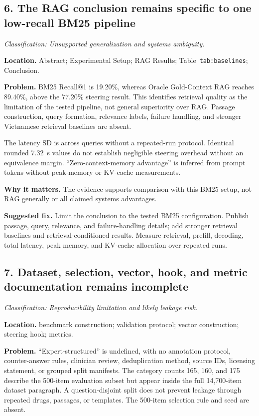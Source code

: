 \documentclass[11pt]{article}
\newcommand{\findinglabel}[1]{\textbf{#1}}
\newcommand{\classification}[1]{\textit{Classification: #1.}}
\begin{document}
\subsection*{6. The RAG conclusion remains specific to one low-recall BM25 pipeline}

\classification{Unsupported generalization and systems ambiguity}

\findinglabel{Location.} Abstract; Experimental Setup; RAG Results; Table~\texttt{tab:baselines}; Conclusion.

\findinglabel{Problem.} BM25 Recall@1 is 19.20\%, whereas Oracle Gold-Context RAG reaches 89.40\%, above the 77.20\% steering result.  This identifies retrieval quality as the limitation of the tested pipeline, not general superiority over RAG.  Passage construction, query formation, relevance labels, failure handling, and stronger Vietnamese retrieval baselines are absent.

The latency SD is across queries without a repeated-run protocol.  Identical rounded 7.32~s values do not establish negligible steering overhead without an equivalence margin.  ``Zero-context-memory advantage'' is inferred from prompt tokens without peak-memory or KV-cache measurements.

\findinglabel{Why it matters.} The evidence supports comparison with this BM25 setup, not RAG generally or all claimed systems advantages.

\findinglabel{Suggested fix.} Limit the conclusion to the tested BM25 configuration.  Publish passage, query, relevance, and failure-handling details; add stronger retrieval baselines and retrieval-conditioned results.  Measure retrieval, prefill, decoding, total latency, peak memory, and KV-cache allocation over repeated runs.

\subsection*{7. Dataset, selection, vector, hook, and metric documentation remains incomplete}

\classification{Reproducibility limitation and likely leakage risk}

\findinglabel{Location.} benchmark construction; validation protocol; vector construction; steering hook; metrics.

\findinglabel{Problem.} ``Expert-structured'' is undefined, with no annotation protocol, counter-answer rules, clinician review, deduplication method, source IDs, licensing statement, or grouped split manifests.  The category counts 165, 160, and 175 describe the 500-item evaluation subset but appear inside the full 14,700-item dataset paragraph.  A question-disjoint split does not prevent leakage through repeated drugs, passages, or templates.  The 500-item selection rule and seed are absent.
\end{document}
